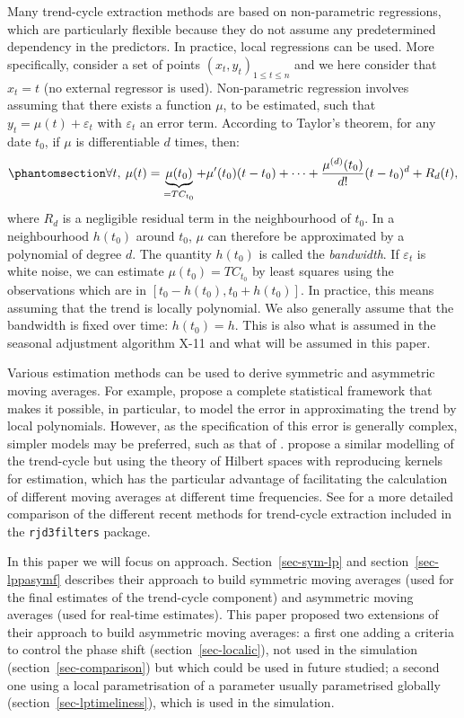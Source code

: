 \documentclass[
]{article}
\newcommand\1{\mathds{1}}
\begin{document}
Many trend-cycle extraction methods are based on non-parametric
regressions, which are particularly flexible because they do not assume
any predetermined dependency in the predictors. In practice, local
regressions can be used. More specifically, consider a set of points
\((x_t,y_t)_{1\leq t\leq n}\) and we here consider that \(x_t=t\) (no
external regressor is used). Non-parametric regression involves assuming
that there exists a function \(\mu\), to be estimated, such that
\(y_t=\mu(t)+\varepsilon_t\) with \(\varepsilon_t\) an error term.
According to Taylor's theorem, for any date \(t_0\), if \(\mu\) is
differentiable \(d\) times, then:
\begin{equation}\phantomsection\label{eq-taylor}{
\forall t,\:\mu(t) = \underbrace{\mu(t_0)}_{=TC_{t_0}} + \mu'(t_0)(t-t_0)+\dots +
\frac{\mu^{(d)}(t_0)}{d!}(t-t_0)^d+R_d(t),
}\end{equation} where \(R_d\) is a negligible residual term in the
neighbourhood of \(t_0\). In a neighbourhood \(h(t_0)\) around \(t_0\),
\(\mu\) can therefore be approximated by a polynomial of degree \(d\).
The quantity \(h(t_0)\) is called the \emph{bandwidth}. If
\(\varepsilon_t\) is white noise, we can estimate \(\mu(t_0)=TC_{t_0}\)
by least squares using the observations which are in
\(\left[t_0-h(t_0),t_0+h(t_0)\right]\). In practice, this means assuming
that the trend is locally polynomial. We also generally assume that the
bandwidth is fixed over time: \(h(t_0)=h.\) This is also what is assumed
in the seasonal adjustment algorithm X-11 and what will be assumed in
this paper.

Various estimation methods can be used to derive symmetric and
asymmetric moving averages. For example, \textcite{GrayThomson1996}
propose a complete statistical framework that makes it possible, in
particular, to model the error in approximating the trend by local
polynomials. However, as the specification of this error is generally
complex, simpler models may be preferred, such as that of
\textcite{proietti2008}. \textcite{dagumbianconcini2008} propose a
similar modelling of the trend-cycle but using the theory of Hilbert
spaces with reproducing kernels for estimation, which has the particular
advantage of facilitating the calculation of different moving averages
at different time frequencies. See \textcite{inseeDTM202401} for a more
detailed comparison of the different recent methods for trend-cycle
extraction included in the \texttt{rjd3filters} package.

In this paper we will focus on \textcite{proietti2008} approach.
Section~\ref{sec-sym-lp} and section~\ref{sec-lppasymf} describes their
approach to build symmetric moving averages (used for the final
estimates of the trend-cycle component) and asymmetric moving averages
(used for real-time estimates). This paper proposed two extensions of
their approach to build asymmetric moving averages: a first one adding a
criteria to control the phase shift (section~\ref{sec-localic}), not
used in the simulation (section~\ref{sec-comparison}) but which could be
used in future studied; a second one using a local parametrisation of a
parameter usually parametrised globally
(section~\ref{sec-lptimeliness}), which is used in the simulation.
\end{document}
